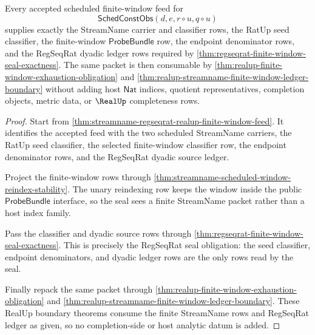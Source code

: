 \begin{theorem}
\label{thm:streamname-regseqrat-seal-scope}
Every accepted scheduled finite-window feed for
$$
\mathsf{SchedConstObs}(d,e,r\circ u,q\circ u)
$$
supplies exactly the StreamName carrier and classifier rows, the RatUp seed
classifier, the finite-window $\mathsf{ProbeBundle}$ row, the endpoint
denominator rows, and the RegSeqRat dyadic ledger rows required by
\autoref{thm:regseqrat-finite-window-seal-exactness}. The same packet is
then consumable by \autoref{thm:realup-finite-window-exhaustion-obligation}
and \autoref{thm:realup-streamname-finite-window-ledger-boundary} without
adding host $\mathsf{Nat}$ indices, quotient representatives, completion
objects, metric data, or $\RealUp$ completeness rows.
\end{theorem}
\begin{proof}
Start from
\autoref{thm:streamname-regseqrat-realup-finite-window-feed}. It identifies
the accepted feed with the two scheduled StreamName carriers, the RatUp seed
classifier, the selected finite-window classifier row, the endpoint
denominator rows, and the RegSeqRat dyadic source ledger.

Project the finite-window rows through
\autoref{thm:streamname-scheduled-window-reindex-stability}. The unary
reindexing row keeps the window inside the public $\mathsf{ProbeBundle}$
interface, so the seal sees a finite StreamName packet rather than a host
index family.

Pass the classifier and dyadic source rows through
\autoref{thm:regseqrat-finite-window-seal-exactness}. This is precisely the
RegSeqRat seal obligation: the seed classifier, endpoint denominators, and
dyadic ledger rows are the only rows read by the seal.

Finally repack the same packet through
\autoref{thm:realup-finite-window-exhaustion-obligation} and
\autoref{thm:realup-streamname-finite-window-ledger-boundary}. These RealUp
boundary theorems consume the finite StreamName rows and RegSeqRat ledger as
given, so no completion-side or host analytic datum is added.
\end{proof}

